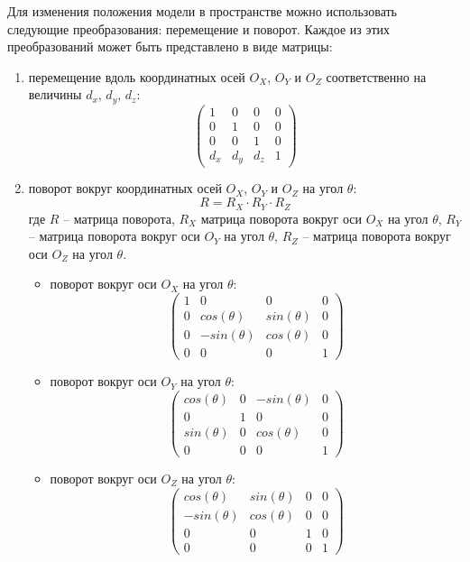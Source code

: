 Для изменения положения модели в пространстве можно использовать следующие преобразования: перемещение и поворот. Каждое из этих преобразований может быть представлено в виде матрицы:
\begin{enumerate}
	\item перемещение вдоль координатных осей $O_X$, $O_Y$ и $O_Z$ соответственно на величины $d_x$, $d_y$, $d_z$:
	\begin{equation}
		\begin{pmatrix}
			1 & 0 & 0 & 0 \\
			0 & 1 & 0 & 0 \\
			0 & 0 & 1 & 0 \\
			d_x & d_y & d_z & 1
		\end{pmatrix}
	\end{equation}
	\item поворот вокруг координатных осей $O_X$, $O_Y$ и $O_Z$ на угол $\theta$:
	\begin{equation}
		R = R_X \cdot R_Y \cdot R_Z
	\end{equation}
	где $R$ -- матрица поворота, $R_X$ матрица поворота вокруг оси $O_X$ на угол $\theta$, $R_Y$ -- матрица поворота вокруг оси $O_Y$ на угол $\theta$, $R_Z$ -- матрица поворота вокруг оси $O_Z$ на угол $\theta$.
	\begin{itemize}[label=--]
		\item поворот вокруг оси $O_X$ на угол $\theta$:
		\begin{equation}
			\begin{pmatrix}
				1 & 0 & 0 & 0 \\
				0 & cos(\theta) & sin(\theta) & 0 \\
				0 & -sin(\theta) & cos(\theta) & 0 \\
				0 & 0 & 0 & 1
			\end{pmatrix}
		\end{equation}
		\item поворот вокруг оси $O_Y$ на угол $\theta$:
		\begin{equation}
			\begin{pmatrix}
				cos(\theta) & 0 & -sin(\theta) & 0 \\
				0 & 1 & 0 & 0 \\
				sin(\theta) & 0 & cos(\theta) & 0 \\
				0 & 0 & 0 & 1
			\end{pmatrix}
		\end{equation}
		\item поворот вокруг оси $O_Z$ на угол $\theta$:
		\begin{equation}
			\begin{pmatrix}
				cos(\theta) & sin(\theta) & 0 & 0 \\
				-sin(\theta) & cos(\theta) & 0 & 0 \\
				0 & 0 & 1 & 0 \\
				0 & 0 & 0 & 1
			\end{pmatrix}
		\end{equation}
	\end{itemize}
\end{enumerate}

